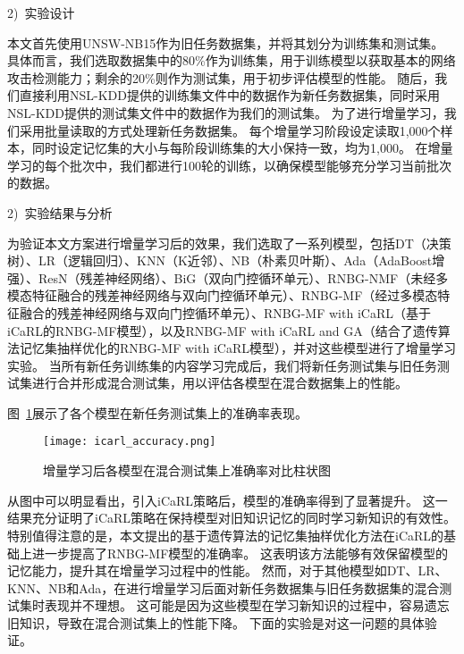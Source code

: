 2)~实验设计\par

本文首先使用UNSW-NB15作为旧任务数据集，并将其划分为训练集和测试集。
具体而言，我们选取数据集中的80\%作为训练集，用于训练模型以获取基本的网络攻击检测能力；剩余的20\%则作为测试集，用于初步评估模型的性能。
随后，我们直接利用NSL-KDD提供的训练集文件中的数据作为新任务数据集，同时采用NSL-KDD提供的测试集文件中的数据作为我们的测试集。
为了进行增量学习，我们采用批量读取的方式处理新任务数据集。
每个增量学习阶段设定读取1,000个样本，同时设定记忆集的大小与每阶段训练集的大小保持一致，均为1,000。
在增量学习的每个批次中，我们都进行100轮的训练，以确保模型能够充分学习当前批次的数据。\par
2)~实验结果与分析\par
为验证本文方案进行增量学习后的效果，我们选取了一系列模型，包括DT（决策树）、LR（逻辑回归）、KNN（K近邻）、NB（朴素贝叶斯）、Ada（AdaBoost增强）、ResN（残差神经网络）、BiG（双向门控循环单元）、RNBG-NMF（未经多模态特征融合的残差神经网络与双向门控循环单元）、RNBG-MF（经过多模态特征融合的残差神经网络与双向门控循环单元）、RNBG-MF with iCaRL（基于iCaRL的RNBG-MF模型），以及RNBG-MF with iCaRL and GA（结合了遗传算法记忆集抽样优化的RNBG-MF with iCaRL模型），并对这些模型进行了增量学习实验。
当所有新任务训练集的内容学习完成后，我们将新任务测试集与旧任务测试集进行合并形成混合测试集，用以评估各模型在混合数据集上的性能。\par

图~\ref{fig:acc_icarl}展示了各个模型在新任务测试集上的准确率表现。
\begin{figure}[h]
	\centering
	\texttt{[image: icarl\_accuracy.png]}
	\caption{增量学习后各模型在混合测试集上准确率对比柱状图}
	\label{fig:acc_icarl}
\end{figure}
从图中可以明显看出，引入iCaRL策略后，模型的准确率得到了显著提升。
这一结果充分证明了iCaRL策略在保持模型对旧知识记忆的同时学习新知识的有效性。
特别值得注意的是，本文提出的基于遗传算法的记忆集抽样优化方法在iCaRL的基础上进一步提高了RNBG-MF模型的准确率。
这表明该方法能够有效保留模型的记忆能力，提升其在增量学习过程中的性能。
然而，对于其他模型如DT、LR、KNN、NB和Ada，在进行增量学习后面对新任务数据集与旧任务数据集的混合测试集时表现并不理想。
这可能是因为这些模型在学习新知识的过程中，容易遗忘旧知识，导致在混合测试集上的性能下降。
下面的实验是对这一问题的具体验证。

